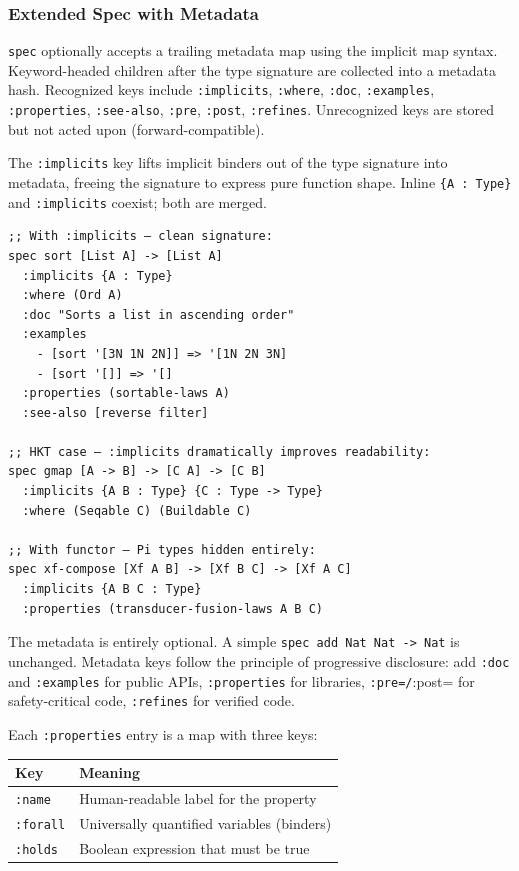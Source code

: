 \documentclass[11pt]{article}
\begin{document}
\subsubsection{Extended Spec with Metadata}
\label{sec:orgb5eb98f}

\texttt{spec} optionally accepts a trailing metadata map using the implicit map
syntax. Keyword-headed children after the type signature are collected into a
metadata hash. Recognized keys include \texttt{:implicits}, \texttt{:where}, \texttt{:doc},
\texttt{:examples}, \texttt{:properties}, \texttt{:see-also}, \texttt{:pre}, \texttt{:post}, \texttt{:refines}.
Unrecognized keys are stored but not acted upon (forward-compatible).

The \texttt{:implicits} key lifts implicit binders out of the type signature into
metadata, freeing the signature to express pure function shape. Inline
\texttt{\{A : Type\}} and \texttt{:implicits} coexist; both are merged.

\begin{verbatim}
;; With :implicits — clean signature:
spec sort [List A] -> [List A]
  :implicits {A : Type}
  :where (Ord A)
  :doc "Sorts a list in ascending order"
  :examples
    - [sort '[3N 1N 2N]] => '[1N 2N 3N]
    - [sort '[]] => '[]
  :properties (sortable-laws A)
  :see-also [reverse filter]

;; HKT case — :implicits dramatically improves readability:
spec gmap [A -> B] -> [C A] -> [C B]
  :implicits {A B : Type} {C : Type -> Type}
  :where (Seqable C) (Buildable C)

;; With functor — Pi types hidden entirely:
spec xf-compose [Xf A B] -> [Xf B C] -> [Xf A C]
  :implicits {A B C : Type}
  :properties (transducer-fusion-laws A B C)
\end{verbatim}

The metadata is entirely optional. A simple \texttt{spec add Nat Nat -> Nat} is
unchanged. Metadata keys follow the principle of progressive disclosure: add
\texttt{:doc} and \texttt{:examples} for public APIs, \texttt{:properties} for libraries,
\texttt{:pre=/}:post= for safety-critical code, \texttt{:refines} for verified code.

Each \texttt{:properties} entry is a map with three keys:

\begin{center}
\begin{tabular}{ll}
Key & Meaning\\
\hline
\texttt{:name} & Human-readable label for the property\\
\texttt{:forall} & Universally quantified variables (binders)\\
\texttt{:holds} & Boolean expression that must be true\\
\end{tabular}
\end{center}
\end{document}
